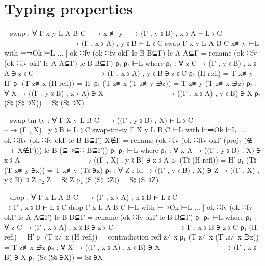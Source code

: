 \documentclass[logo,bsc,singlespacing,parskip,online]{infthesis}
\renewenvironment{code}{\mintedcopy[breaklines,breaksymbolleft=\;]{agda}}{\endmintedcopy}
\begin{document}
\section{Typing properties}
\label{appendix:f_type_properties}
\begin{code}
  -- swap : ∀ {Γ x y L A B C}
  --   → x ≢ y
  --   → (Γ , y ⦂ B) , x ⦂ A ⊢ L ⦂ C
  --     -------------------------
  --   → (Γ , x ⦂ A) , y ⦂ B ⊢ L ⦂ C
  swap {Γ} {x} {y} {L} {A} {B} {C} x≢y ⊢L with ⊢⇒Ok ⊢L
  ... | ok-∷fv (ok-∷fv okΓ lc-B B⊆Γ) lc-A A⊆Γ =
    rename (ok-∷fv (ok-∷fv okΓ lc-A A⊆Γ) lc-B B⊆Γ) ρ₁ ρ₂ ⊢L
    where
      ρ₁ : ∀ {z C}
        → (Γ , y ⦂ B) , x ⦂ A ∋ z ⦂ C
          -------------------------
        → (Γ , x ⦂ A) , y ⦂ B ∋ z ⦂ C
      ρ₁ (H refl) = T x≢y H′
      ρ₁ (T z≢x (H refl)) = H′
      ρ₁ (T z≢x (T z≢y ∋z)) = T z≢y (T z≢x ∋z)
      ρ₂ : ∀ {X}
        → ((Γ , y ⦂ B) , x ⦂ A) ∋ X
          -------------------------
        → ((Γ , x ⦂ A) , y ⦂ B) ∋ X
      ρ₂ (S⦂ (S⦂ ∋X)) = S⦂ (S⦂ ∋X)

  -- swap-tm-ty : ∀ {Γ X y L B C}
  --   → ((Γ , y ⦂ B) , X) ⊢ L ⦂ C
  --     -------------------------
  --   → (Γ , X) , y ⦂ B ⊢ L ⦂ C
  swap-tm-ty {Γ} {X} {y} {L} {B} {C} ⊢L with ⊢⇒Ok ⊢L
  ... | ok-∷ftv (ok-∷fv okΓ lc-B B⊆Γ) X∉Γ = rename (ok-∷fv (ok-∷ftv okΓ (proj₂ (∉-++ X∉Γ))) lc-B (⊆⇒⊆∷ B⊆Γ)) ρ₁ ρ₂ ⊢L
    where
      ρ₁ : ∀ {x A}
        → ((Γ , y ⦂ B) , X) ∋ x ⦂ A
          -------------------------
        → ((Γ , X) , y ⦂ B) ∋ x ⦂ A
      ρ₁ (T⦂ (H refl)) = H′
      ρ₁ (T⦂ (T x≢y ∋x)) = T x≢y (T⦂ ∋x)
      ρ₂ : ∀ {Z : Id}
        → ((Γ , y ⦂ B) , X) ∋ Z
        → ((Γ , X) , y ⦂ B) ∋ Z
      ρ₂ Z = S⦂ Z
      ρ₂ (S (S⦂ ∋Z)) = S⦂ (S ∋Z)

  -- drop : ∀ {Γ x L A B C}
  --   → (Γ , x ⦂ A) , x ⦂ B ⊢ L ⦂ C
  --     --------------------------
  --   → Γ , x ⦂ B ⊢ L ⦂ C
  drop {Γ} {x} {L} {A} {B} {C} ⊢L with ⊢⇒Ok ⊢L
  ... | ok-∷fv (ok-∷fv okΓ lc-A A⊆Γ) lc-B B⊆Γ =
    rename (ok-∷fv okΓ lc-B B⊆Γ) ρ₁ ρ₂ ⊢L
    where
      ρ₁ : ∀ {z C}
        → (Γ , x ⦂ A) , x ⦂ B ∋ z ⦂ C
          -------------------------
        → Γ , x ⦂ B ∋ z ⦂ C
      ρ₁ (H refl) = H′
      ρ₁ (T z≢x (H refl)) = contradiction refl z≢x
      ρ₁ (T z≢x (T .z≢x ∋z)) = T z≢x ∋z
      ρ₂ : ∀ {X}
        → ((Γ , x ⦂ A) , x ⦂ B) ∋ X
          -------------------------
        → (Γ , x ⦂ B) ∋ X
      ρ₂ (S⦂ (S⦂ ∋X)) = S⦂ ∋X
\end{code}
\end{document}
